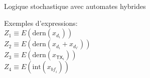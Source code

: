 \documentclass[aspectratio=43]{beamer} %
\begin{document}
\begin{frame}{Logique stochastique avec automates hybrides}
\begin{minipage}{.69\textwidth}
\begin{tiny}
{%
    }
    \end{tiny}
  \end{minipage}
  \begin{minipage}{.30\textwidth}
    \begin{footnotesize}
      \raggedright
      Exemples d'expressions:\\
      \medskip
      $Z_1\equiv E(\mbox{dern}(x_{d_i}))$\\
      $Z_2\equiv E(\mbox{dern}(x_{d_i}+x_{d_{i'}}))$\\
      $Z_3\equiv E(\mbox{dern}(x_{\mathsf{TX}_i}))$\\
      $Z_4\equiv E(\mbox{int}(x_{\mathit{bf}_i}))$\\
    \end{footnotesize}
  \end{minipage}
\end{frame}
\end{document}
